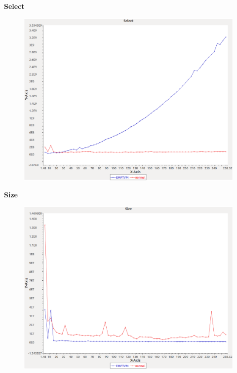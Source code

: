 \noindent\textbf{Select}

\begin{figure}[h]
\centering
\includegraphics[width=\textwidth]{../graphs/set/Select}
\end{figure}
\pagebreak

\noindent\textbf{Size}

\begin{figure}[h]
\centering
\includegraphics[width=\textwidth]{../graphs/set/Size}
\end{figure}
\pagebreak

